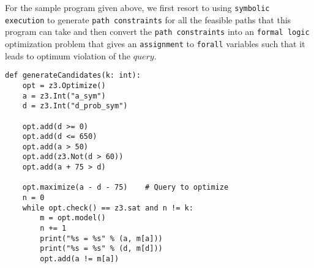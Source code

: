 \documentclass{article}
\begin{document}
For the sample program given above, we first resort to using \texttt{symbolic execution} to generate \texttt{path constraints} for all the feasible paths that this program can take and then convert the \texttt{path constraints} into an \texttt{formal logic} optimization problem that gives an \texttt{assignment} to \texttt{forall} variables such that it leads to optimum violation of the $query$.

\begin{verbatim}
def generateCandidates(k: int):
	opt = z3.Optimize()
	a = z3.Int("a_sym")
	d = z3.Int("d_prob_sym")
	
	opt.add(d >= 0)
	opt.add(d <= 650)
	opt.add(a > 50)
	opt.add(z3.Not(d > 60))
	opt.add(a + 75 > d)

	opt.maximize(a - d - 75) 	# Query to optimize
	n = 0
	while opt.check() == z3.sat and n != k:
		m = opt.model()
		n += 1
		print("%s = %s" % (a, m[a]))
		print("%s = %s" % (d, m[d]))
		opt.add(a != m[a])
\end{verbatim}
\end{document}
